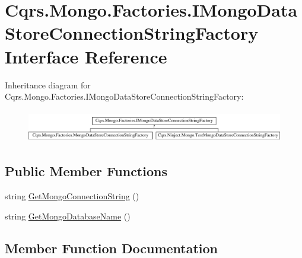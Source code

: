 \hypertarget{interfaceCqrs_1_1Mongo_1_1Factories_1_1IMongoDataStoreConnectionStringFactory}{}\section{Cqrs.\+Mongo.\+Factories.\+I\+Mongo\+Data\+Store\+Connection\+String\+Factory Interface Reference}
\label{interfaceCqrs_1_1Mongo_1_1Factories_1_1IMongoDataStoreConnectionStringFactory}
Inheritance diagram for Cqrs.\+Mongo.\+Factories.\+I\+Mongo\+Data\+Store\+Connection\+String\+Factory\+:\begin{figure}[H]
\begin{center}
\leavevmode
\includegraphics[height=1.417722cm]{interfaceCqrs_1_1Mongo_1_1Factories_1_1IMongoDataStoreConnectionStringFactory}
\end{center}
\end{figure}
\subsection*{Public Member Functions}
\begin{DoxyCompactItemize}
\item 
string \hyperlink{interfaceCqrs_1_1Mongo_1_1Factories_1_1IMongoDataStoreConnectionStringFactory_ad8ea94d071ebedf6b137a0b99c2cc12c}{Get\+Mongo\+Connection\+String} ()
\item 
string \hyperlink{interfaceCqrs_1_1Mongo_1_1Factories_1_1IMongoDataStoreConnectionStringFactory_a90de27c2bf23d7f9412d55c09ab2ec8c}{Get\+Mongo\+Database\+Name} ()
\end{DoxyCompactItemize}


\subsection{Member Function Documentation}
\mbox{\label{interfaceCqrs_1_1Mongo_1_1Factories_1_1IMongoDataStoreConnectionStringFactory_ad8ea94d071ebedf6b137a0b99c2cc12c}} 
